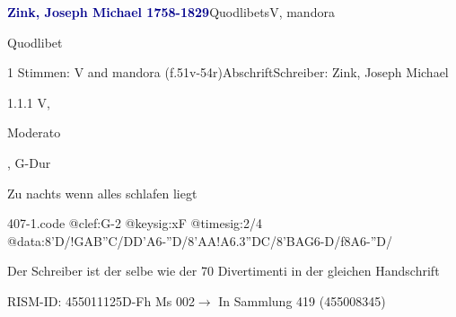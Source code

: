 \documentclass[twocolumn]{book}
\begin{document}
\par \vspace{7pt} \textcolor{darkblue}{\textbf{Zink, Joseph Michael  1758-1829}}\hfillplus{\textbf{[407]}}\newline Quodlibets\newline V, mandora
\par \begin{itshape}[heading, f.51v:] Quodlibet\end{itshape} 
\par \textcolor{darkblue}{}  1 Stimmen: V and mandora  (f.51v-54r)\newline Abschrift\newline Schreiber: Zink, Joseph Michael
\par 1.1.1  V, \begin{itshape}Moderato\end{itshape}, G-Dur\newline \begin{footnotesize} Zu nachts wenn alles schlafen liegt \end{footnotesize}  
\begin{filecontents*}{407-1.code}
@clef:G-2
@keysig:xF
@timesig:2/4
@data:8'D/!GAB''C/DD'A6-''D/8'AA!{A6.3''DC}/8'BAG6-D/f8A6-''D/
\end{filecontents*}
\newline
%
\par Der Schreiber ist der selbe wie der 70 Divertimenti in der gleichen Handschrift
\par RISM-ID: 455011125\newline D-Fh  Ms 002\newline $\rightarrow$ In Sammlung 419 (455008345)
      
\end{document}
